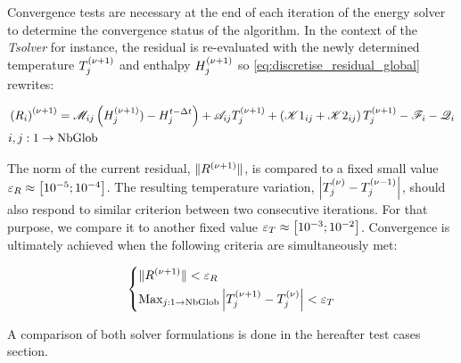 Convergence tests are necessary at the end of each iteration of the energy solver to determine 
the convergence status of the algorithm. In the context of the \emph{Tsolver} for instance, the residual 
is re-evaluated with the newly determined temperature $\Tj^\iterplus$ and enthalpy $\Hj^\iterplus$ so \cref{eq:discretise_residual_global} rewrites:

\begin{align}
\begin{split}
\label{eq:discretise_residual_global_new}
& \brac{R_i}^\iterplus = \Mij \brac{\Hj^\iterplus) - \Hjtminus} + \Aij \Tj^\iterplus + \brac{\Kija + \Kijb}\Tj^\iterplus -\Fi - \Qi \\
& i,j:1 \rightarrow \text{NbGlob}
\end{split}
\end{align}

The norm of the current residual, $\norm{R^\iterplus}$, is compared to a fixed small 
value $\varepsilon_R \approx \crochet{\num{d-5};\num{d-4}}$. The resulting temperature variation, 
$\abval{\Tj^\iter-\Tj^\iterminus}$, should also respond to similar criterion between two consecutive 
iterations. For that purpose, we compare it to another fixed value $\varepsilon_T \approx \crochet{\num{d-3};\num{d-2}}$.
Convergence is ultimately achieved when the following criteria are simultaneously met:

\begin{equation}
\label{eq:energy_convergence_criteria}
   \left\{
   \begin{aligned}
      & \norm{R^\iterplus} < \varepsilon_R \\
	  & \text{Max}_{j:1 \rightarrow \text{NbGlob}} \abval{\Tj^\iterplus-\Tj^\iter} < \varepsilon_T
    \end{aligned}
    \right.
\end{equation}

A comparison of both solver formulations is done in the hereafter test cases section.


